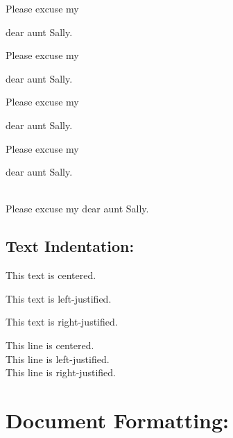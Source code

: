 \documentclass[11pt]{article}
\begin{document}
\vspace{1cm}
Please excuse my \begin{Huge}dear aunt Sally.
\end{Huge}

\vspace{1cm}
Please excuse my \begin{small}dear aunt Sally.
\end{small} 

\vspace{1cm}
Please excuse my \begin{scriptsize}dear aunt Sally.
\end{scriptsize}

\vspace{1cm}
Please excuse my \begin{tiny}dear aunt Sally.
\end{tiny}\\

\Large
Please excuse my dear aunt Sally.

\subsection{Text Indentation:}
\begin{center}
This text is centered.
\end{center}

\begin{flushleft}
This text is left-justified.
\end{flushleft}

\begin{flushright}
This text is right-justified.
\end{flushright}

This line is centered.\\
This line is left-justified.\\
This line is right-justified.\\


\pagebreak
\section{Document Formatting:}
\end{document}
